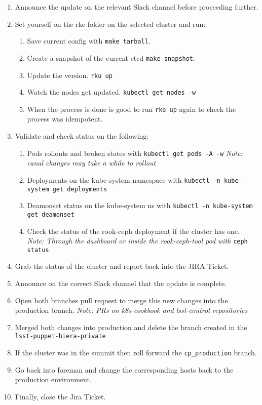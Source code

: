 \begin{enumerate}
  \item Announce the update on the relevant Slack channel before proceeding further.
  \item Set yourself on the rke folder on the selected cluster and run:
  \begin{enumerate}[label=(\alph*)]
    \item Save current config with \verb|make tarball|.
    \item Create a snapshot of the current etcd \verb|make snapshot|.
    \item Update the version. \verb|rku up|
    \item Watch the nodes get updated. \verb|kubectl get nodes -w|
    \item When the process is done is good to run \verb|rke up| again to check the process was idempotent.
  \end{enumerate}
  \item Validate and check status on the following:
  \begin{enumerate}[label=(\alph*)]
    \item Pods rollouts and broken states with \verb|kubectl get pods -A -w|
    \textit{Note: canal changes may take a while to rollout}
    \item Deployments on the kube-system namespace with \verb|kubectl -n kube-system get deployments|
    \item Deamonset status on the kube-system ns with \verb|kubectl -n kube-system get deamonset|
    \item Check the status of the rook-ceph deployment if the cluster has one.
    \textit{Note: Through the dashboard or inside the rook-ceph-tool pod with} \verb|ceph status|
  \end{enumerate}
  \item Grab the status of the cluster and report back into the JIRA Ticket.
  \item Announce on the correct Slack channel that the update is complete.
  \item Open both branches pull request to merge this new changes into the production branch.
  \textit{Note: PRs on k8s-cookbook and lsst-control repositories}
  \item Merged both changes into production and delete the branch created in the
    \verb|lsst-puppet-hiera-private|
  \item If the cluster was in the summit then roll forward the \verb|cp_production| branch.
  \item Go back into foreman and change the corresponding hosts back to the production environment.
  \item Finally, close the Jira Ticket.
\end{enumerate}
\newpage
